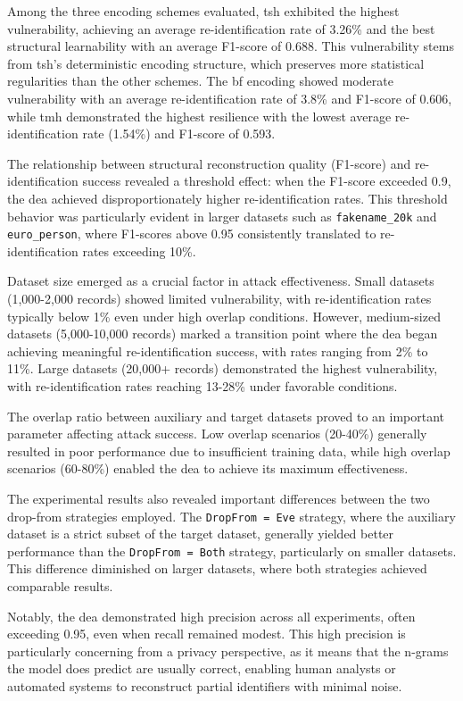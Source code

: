 Among the three encoding schemes evaluated, \ac{tsh} exhibited the highest vulnerability, achieving an average re-identification rate of 3.26\% and the best structural learnability with an average F1-score of 0.688.
This vulnerability stems from \ac{tsh}'s deterministic encoding structure, which preserves more statistical regularities than the other schemes.
The \ac{bf} encoding showed moderate vulnerability with an average re-identification rate of 3.8\% and F1-score of 0.606, while \ac{tmh} demonstrated the highest resilience with the lowest average re-identification rate (1.54\%) and F1-score of 0.593.

The relationship between structural reconstruction quality (F1-score) and re-identification success revealed a threshold effect: when the F1-score exceeded 0.9, the \ac{dea} achieved disproportionately higher re-identification rates.
This threshold behavior was particularly evident in larger datasets such as \texttt{fakename\_20k} and \texttt{euro\_person}, where F1-scores above 0.95 consistently translated to re-identification rates exceeding 10\%.

Dataset size emerged as a crucial factor in attack effectiveness.
Small datasets (1,000-2,000 records) showed limited vulnerability, with re-identification rates typically below 1\% even under high overlap conditions.
However, medium-sized datasets (5,000-10,000 records) marked a transition point where the \ac{dea} began achieving meaningful re-identification success, with rates ranging from 2\% to 11\%.
Large datasets (20,000+ records) demonstrated the highest vulnerability, with re-identification rates reaching 13-28\% under favorable conditions.

The overlap ratio between auxiliary and target datasets proved to an important parameter affecting attack success.
Low overlap scenarios (20-40\%) generally resulted in poor performance due to insufficient training data, while high overlap scenarios (60-80\%) enabled the \ac{dea} to achieve its maximum effectiveness.

The experimental results also revealed important differences between the two drop-from strategies employed.
The \texttt{DropFrom = Eve} strategy, where the auxiliary dataset is a strict subset of the target dataset, generally yielded better performance than the \texttt{DropFrom = Both} strategy, particularly on smaller datasets.
This difference diminished on larger datasets, where both strategies achieved comparable results.

Notably, the \ac{dea} demonstrated high precision across all experiments, often exceeding 0.95, even when recall remained modest.
This high precision is particularly concerning from a privacy perspective, as it means that the n-grams the model does predict are usually correct, enabling human analysts or automated systems to reconstruct partial identifiers with minimal noise.

